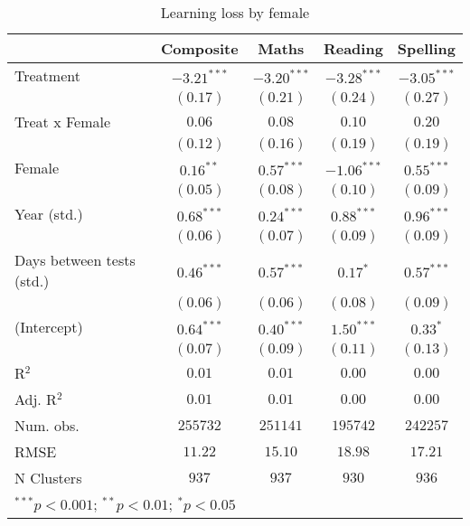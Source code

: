 
\begin{table}
\begin{center}
\begin{tabular}{l c c c c}
\hline
 & Composite & Maths & Reading & Spelling \\
\hline
Treatment                 & $-3.21^{***}$ & $-3.20^{***}$ & $-3.28^{***}$ & $-3.05^{***}$ \\
                          & $(0.17)$      & $(0.21)$      & $(0.24)$      & $(0.27)$      \\
Treat x Female            & $0.06$        & $0.08$        & $0.10$        & $0.20$        \\
                          & $(0.12)$      & $(0.16)$      & $(0.19)$      & $(0.19)$      \\
Female                    & $0.16^{**}$   & $0.57^{***}$  & $-1.06^{***}$ & $0.55^{***}$  \\
                          & $(0.05)$      & $(0.08)$      & $(0.10)$      & $(0.09)$      \\
Year (std.)               & $0.68^{***}$  & $0.24^{***}$  & $0.88^{***}$  & $0.96^{***}$  \\
                          & $(0.06)$      & $(0.07)$      & $(0.09)$      & $(0.09)$      \\
Days between tests (std.) & $0.46^{***}$  & $0.57^{***}$  & $0.17^{*}$    & $0.57^{***}$  \\
                          & $(0.06)$      & $(0.06)$      & $(0.08)$      & $(0.09)$      \\
(Intercept)               & $0.64^{***}$  & $0.40^{***}$  & $1.50^{***}$  & $0.33^{*}$    \\
                          & $(0.07)$      & $(0.09)$      & $(0.11)$      & $(0.13)$      \\
\hline
R$^2$                     & $0.01$        & $0.01$        & $0.00$        & $0.00$        \\
Adj. R$^2$                & $0.01$        & $0.01$        & $0.00$        & $0.00$        \\
Num. obs.                 & $255732$      & $251141$      & $195742$      & $242257$      \\
RMSE                      & $11.22$       & $15.10$       & $18.98$       & $17.21$       \\
N Clusters                & $937$         & $937$         & $930$         & $936$         \\
\hline
\multicolumn{5}{l}{\scriptsize{$^{***}p<0.001$; $^{**}p<0.01$; $^{*}p<0.05$}}
\end{tabular}
\caption{Learning loss by female}
\label{tablefemale}
\end{center}
\end{table}

